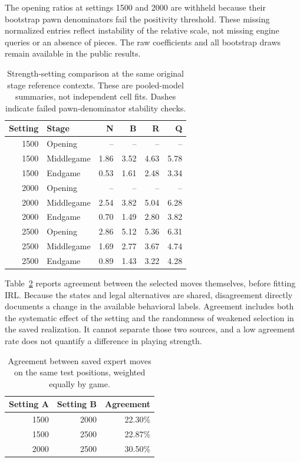 The opening ratios at settings 1500 and 2000 are withheld because their bootstrap pawn denominators fail the positivity threshold. These missing normalized entries reflect instability of the relative scale, not missing engine queries or an absence of pieces. The raw coefficients and all bootstrap draws remain available in the public results.
\begin{table}[htbp]\centering
\small
\caption{Strength-setting comparison at the same original stage reference contexts. These are pooled-model summaries, not independent cell fits. Dashes indicate failed pawn-denominator stability checks.}\label{tab:elostages}
\begin{tabular}{rlrrrr}
\toprule
Setting & Stage & N & B & R & Q\\\midrule
1500 & Opening & -- & -- & -- & --\\
1500 & Middlegame & 1.86 & 3.52 & 4.63 & 5.78\\
1500 & Endgame & 0.53 & 1.61 & 2.48 & 3.34\\
2000 & Opening & -- & -- & -- & --\\
2000 & Middlegame & 2.54 & 3.82 & 5.04 & 6.28\\
2000 & Endgame & 0.70 & 1.49 & 2.80 & 3.82\\
2500 & Opening & 2.86 & 5.12 & 5.36 & 6.31\\
2500 & Middlegame & 1.69 & 2.77 & 3.67 & 4.74\\
2500 & Endgame & 0.89 & 1.43 & 3.22 & 4.28\\
\bottomrule\end{tabular}\end{table}

Table~\ref{tab:eloagree} reports agreement between the selected moves themselves, before fitting IRL. Because the states and legal alternatives are shared, disagreement directly documents a change in the available behavioral labels. Agreement includes both the systematic effect of the setting and the randomness of weakened selection in the saved realization. It cannot separate those two sources, and a low agreement rate does not quantify a difference in playing strength.
\begin{table}[htbp]\centering
\small
\caption{Agreement between saved expert moves on the same test positions, weighted equally by game.}\label{tab:eloagree}
\begin{tabular}{rrr}
\toprule
Setting A & Setting B & Agreement\\\midrule
1500 & 2000 & 22.30\%\\
1500 & 2500 & 22.87\%\\
2000 & 2500 & 30.50\%\\
\bottomrule\end{tabular}\end{table}

